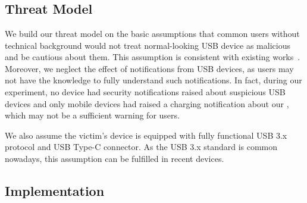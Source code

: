 \section{\tool}
\label{sec:badusb}
\subsection{Threat Model}

We build our threat model on the basic assumptions that common users without
technical background would not treat normal-looking USB device as malicious and be cautious about them. This assumption is consistent with existing works~\cite{JFCImpact}. Moreover, we neglect the
effect of notifications from USB devices, as users may not have the knowledge to fully understand such notifications. In
fact, during our experiment, no device had security notifications raised about
suspicious USB devices and only mobile devices had raised a charging notification
about our \tool, which may not be a sufficient warning for users.

We also assume the victim's device is equipped with fully functional USB 3.x
protocol and USB Type-C connector. As the USB 3.x standard is
common nowadays, this assumption can be fulfilled in recent
devices.


\subsection{Implementation}

